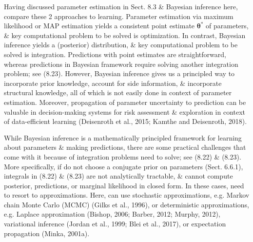 \documentclass{article}
\begin{document}
\begin{itemize}
\begin{itemize}
\begin{itemize}
			Having discussed parameter estimation in Sect. 8.3 \& Bayesian inference here, compare these 2 approaches to learning. Parameter estimation via maximum likelihood or MAP estimation yields a consistent point estimate $\boldsymbol{\theta}^*$ of parameters, \& key computational problem to be solved is optimization. In contrast, Bayesian inference yields a (posterior) distribution, \& key computational problem to be solved is integration. Predictions with point estimates are straightforward, whereas predictions in Bayesian framework require solving another integration problem; see (8.23). However, Bayesian inference gives us a principled way to incorporate prior knowledge, account for side information, \& incorporate structural knowledge, all of which is not easily done in context of parameter estimation. Moreover, propagation of parameter uncertainty to prediction can be valuable in decision-making systems for risk assessment \& exploration in context of data-efficient learning (Deisenroth et al., 2015; Kamthe and Deisenroth, 2018).
			
			While Bayesian inference is a mathematically principled framework for learning about parameters \& making predictions, there are some practical challenges that come with it because of integration problems need to solve; see (8.22) \& (8.23). More specifically, if do not choose a conjugate prior on parameters (Sect. 6.6.1), integrals in (8.22) \& (8.23) are not analytically tractable, \& cannot compute posterior, predictions, or marginal likelihood in closed form. In these cases, need to resort to approximations. Here, can use stochastic approximations, e.g. Markov chain Monte Carlo (MCMC) (Gilks et al., 1996), or deterministic approximations, e.g. Laplace approximation (Bishop, 2006; Barber, 2012; Murphy, 2012), variational inference (Jordan et al., 1999; Blei et al., 2017), or expectation propagation (Minka, 2001a).
			

\end{itemize}
\end{itemize}
\end{itemize}
\end{document}
